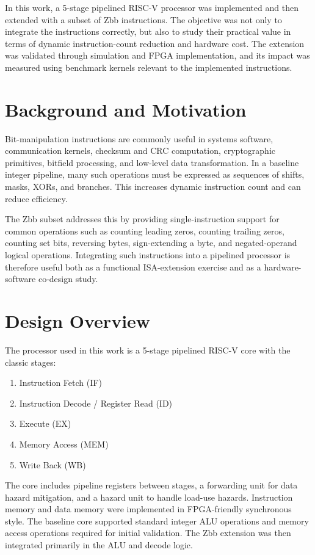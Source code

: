 \documentclass[conference]{IEEEtran}
\begin{document}
	In this work, a 5-stage pipelined RISC-V processor was implemented and then extended with a subset of Zbb instructions. The objective was not only to integrate the instructions correctly, but also to study their practical value in terms of dynamic instruction-count reduction and hardware cost. The extension was validated through simulation and FPGA implementation, and its impact was measured using benchmark kernels relevant to the implemented instructions.
	
	\section{Background and Motivation}
	Bit-manipulation instructions are commonly useful in systems software, communication kernels, checksum and CRC computation, cryptographic primitives, bitfield processing, and low-level data transformation. In a baseline integer pipeline, many such operations must be expressed as sequences of shifts, masks, XORs, and branches. This increases dynamic instruction count and can reduce efficiency.
	
	The Zbb subset addresses this by providing single-instruction support for common operations such as counting leading zeros, counting trailing zeros, counting set bits, reversing bytes, sign-extending a byte, and negated-operand logical operations. Integrating such instructions into a pipelined processor is therefore useful both as a functional ISA-extension exercise and as a hardware-software co-design study.
	
	\section{Design Overview}
	The processor used in this work is a 5-stage pipelined RISC-V core with the classic stages:
	\begin{enumerate}
		\item Instruction Fetch (IF)
		\item Instruction Decode / Register Read (ID)
		\item Execute (EX)
		\item Memory Access (MEM)
		\item Write Back (WB)
	\end{enumerate}
	
	The core includes pipeline registers between stages, a forwarding unit for data hazard mitigation, and a hazard unit to handle load-use hazards. Instruction memory and data memory were implemented in FPGA-friendly synchronous style. The baseline core supported standard integer ALU operations and memory access operations required for initial validation. The Zbb extension was then integrated primarily in the ALU and decode logic.
	
\end{document}
